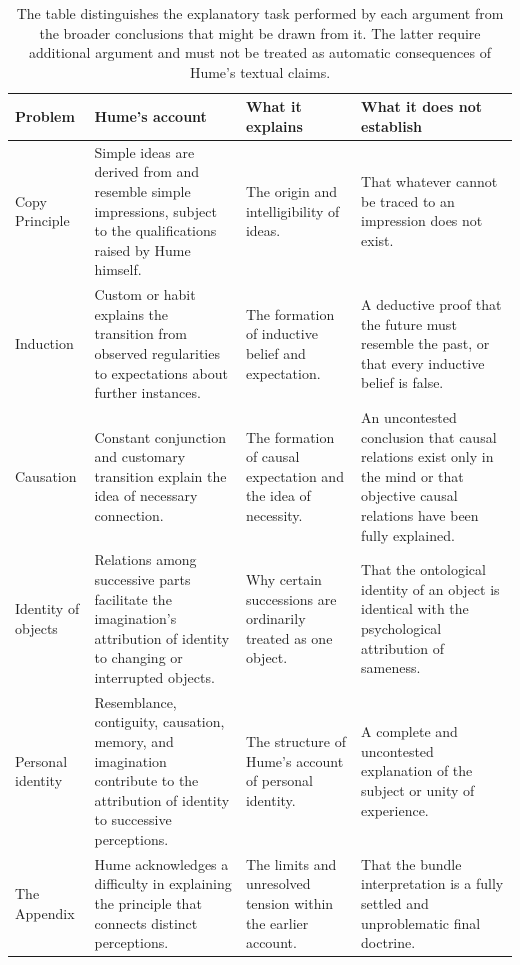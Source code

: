 \begin{table}[htbp]
\centering
\small

\caption{Hume's Principal Claims and Their Comparative Limits}
\label{tab:VS.B01.P01.C08.S09.SS14.P003.TL01}

\begin{tabularx}{\textwidth}{
    >{\raggedright\arraybackslash}p{2.25cm}
    >{\raggedright\arraybackslash}X
    >{\raggedright\arraybackslash}X
    >{\raggedright\arraybackslash}X
}
\toprule
\textbf{Problem}
&
\textbf{Hume's account}
&
\textbf{What it explains}
&
\textbf{What it does not establish}
\\
\midrule

Copy Principle
&
Simple ideas are derived from and resemble simple impressions,
subject to the qualifications raised by Hume himself.
&
The origin and intelligibility of ideas.
&
That whatever cannot be traced to an impression does not exist.
\\

Induction
&
Custom or habit explains the transition from observed
regularities to expectations about further instances.
&
The formation of inductive belief and expectation.
&
A deductive proof that the future must resemble the past,
or that every inductive belief is false.
\\

Causation
&
Constant conjunction and customary transition explain
the idea of necessary connection.
&
The formation of causal expectation and the idea of necessity.
&
An uncontested conclusion that causal relations exist
only in the mind or that objective causal relations
have been fully explained.
\\

Identity of objects
&
Relations among successive parts facilitate the imagination's
attribution of identity to changing or interrupted objects.
&
Why certain successions are ordinarily treated as one object.
&
That the ontological identity of an object is identical
with the psychological attribution of sameness.
\\

Personal identity
&
Resemblance, contiguity, causation, memory, and imagination
contribute to the attribution of identity to successive
perceptions.
&
The structure of Hume's account of personal identity.
&
A complete and uncontested explanation of the subject
or unity of experience.
\\

The Appendix
&
Hume acknowledges a difficulty in explaining the principle
that connects distinct perceptions.
&
The limits and unresolved tension within the earlier account.
&
That the bundle interpretation is a fully settled
and unproblematic final doctrine.
\\

\bottomrule
\end{tabularx}

\caption*{\footnotesize
The table distinguishes the explanatory task performed by
each argument from the broader conclusions that might be
drawn from it. The latter require additional argument and
must not be treated as automatic consequences of Hume's
textual claims.
}

\end{table}

